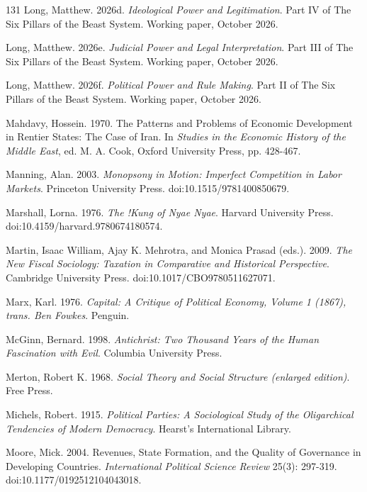 \documentclass[11pt,letterpaper]{article}
\theoremstyle{definition}
\theoremstyle{remark}
\begin{document}
\begin{thebibliography}{131}
Long, Matthew. 2026d. \emph{Ideological Power and Legitimation}. Part IV of The Six Pillars of the Beast System. Working paper, October 2026.

Long, Matthew. 2026e. \emph{Judicial Power and Legal Interpretation}. Part III of The Six Pillars of the Beast System. Working paper, October 2026.

Long, Matthew. 2026f. \emph{Political Power and Rule Making}. Part II of The Six Pillars of the Beast System. Working paper, October 2026.

Mahdavy, Hossein. 1970. The Patterns and Problems of Economic Development in Rentier States: The Case of Iran. In \emph{Studies in the Economic History of the Middle East}, ed. M. A. Cook, Oxford University Press, pp. 428-467.

Manning, Alan. 2003. \emph{Monopsony in Motion: Imperfect Competition in Labor Markets}. Princeton University Press. doi:10.1515/9781400850679.

Marshall, Lorna. 1976. \emph{The !Kung of Nyae Nyae}. Harvard University Press. doi:10.4159/harvard.9780674180574.

Martin, Isaac William, Ajay K. Mehrotra, and Monica Prasad (eds.). 2009. \emph{The New Fiscal Sociology: Taxation in Comparative and Historical Perspective}. Cambridge University Press. doi:10.1017/CBO9780511627071.

Marx, Karl. 1976. \emph{Capital: A Critique of Political Economy, Volume 1 (1867), trans. Ben Fowkes}. Penguin.

McGinn, Bernard. 1998. \emph{Antichrist: Two Thousand Years of the Human Fascination with Evil}. Columbia University Press.

Merton, Robert K. 1968. \emph{Social Theory and Social Structure (enlarged edition)}. Free Press.

Michels, Robert. 1915. \emph{Political Parties: A Sociological Study of the Oligarchical Tendencies of Modern Democracy}. Hearst's International Library.

Moore, Mick. 2004. Revenues, State Formation, and the Quality of Governance in Developing Countries. \emph{International Political Science Review} 25(3): 297-319. doi:10.1177/0192512104043018.


\end{thebibliography}
\end{document}
